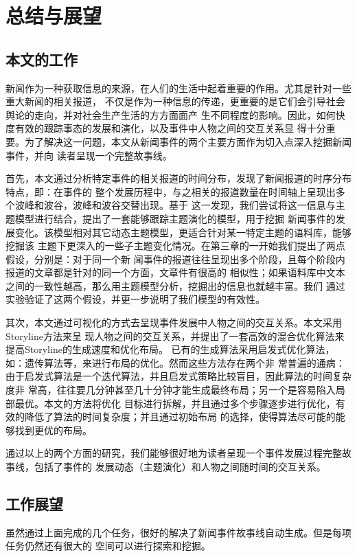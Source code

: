 \chapter{总结与展望}

\section{本文的工作}
新闻作为一种获取信息的来源，在人们的生活中起着重要的作用。尤其是针对一些重大新闻的相关报道，
不仅是作为一种信息的传递，更重要的是它们会引导社会舆论的走向，并对社会生产生活的方方面面产
生不同程度的影响。因此，如何快度有效的跟踪事态的发展和演化，以及事件中人物之间的交互关系显
得十分重要。为了解决这一问题，本文从新闻事件的两个主要方面作为切入点深入挖掘新闻事件，并向
读者呈现一个完整故事线。

首先，本文通过分析特定事件的相关报道的时间分布，发现了新闻报道的时序分布特点，即：在事件的
整个发展历程中，与之相关的报道数量在时间轴上呈现出多个波峰和波谷，波峰和波谷交替出现。基于
这一发现，我们尝试将这一信息与主题模型进行结合，提出了一套能够跟踪主题演化的模型，用于挖掘
新闻事件的发展变化。该模型相对其它动态主题模型，更适合针对某一特定主题的语料库，能够挖掘该
主题下更深入的一些子主题变化情况。在第三章的一开始我们提出了两点假设，分别是：对于同一个新
闻事件的报道往往呈现出多个阶段，且每个阶段内报道的文章都是针对的同一个方面，文章件有很高的
相似性；如果语料库中文本之间的一致性越高，那么用主题模型分析，挖掘出的信息也就越丰富。我们
通过实验验证了这两个假设，并更一步说明了我们模型的有效性。

其次，本文通过可视化的方式去呈现事件发展中人物之间的交互关系。本文采用Storyline方法来呈
现人物之间的交互关系，并提出了一套高效的混合优化算法来提高Storyline的生成速度和优化布局。
已有的生成算法采用启发式优化算法，如：遗传算法等，来进行布局的优化。然而这些方法存在两个非
常普遍的通病：由于启发式算法是一个迭代算法，并且启发式策略比较盲目，因此算法的时间复杂度非
常高，往往要几分钟甚至几十分钟才能生成最终布局；另一个是容易陷入局部最优。本文的方法将优化
目标进行拆解，并且通过多个步骤逐步进行优化，有效的降低了算法的时间复杂度；并且通过初始布局
的选择，使得算法尽可能的能够找到更优的布局。

通过以上的两个方面的研究，我们能够很好地为读者呈现一个事件发展过程完整故事线，包括了事件的
发展动态（主题演化）和人物之间随时间的交互关系。






\section{工作展望}
虽然通过上面完成的几个任务，很好的解决了新闻事件故事线自动生成。但是每项任务仍然还有很大的
空间可以进行探索和挖掘。

